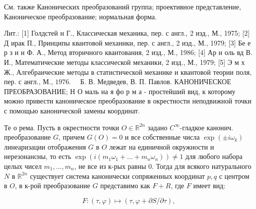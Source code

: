 \documentclass[10pt]{article}
\begin{document}
См. также Канонических преобразований группа; проективное представление, Каноническое преобразование; нормальная форма.



Лит.: [1] Голдстей н Г., Классическая механика, пер. с англ., 2 изд., М., 1975; [2] Д ирак П., Принципы квантовой механики, пер. с англ., 2 изд., М., 1979; [3] Бе е р з и н Ф. А., Метод вторичного квантования, 2 изд., М., 1986; [4] Ар н оль вд В. И., Математические методы классической механики, 2 изд., М., 1979; [5] Э м х Ж., Алгебраические методы в статистической механике и квантовой теории поля, пер. с англ., М., $1976 . \quad$ Б. В. Медведев, В. П. Павлов. КАНОНИЧЕСКОЕ ПРЕОБРАЗОВАНИЕ; Н О маль на я фо р м а - простейший вид, к которому можно привести каноническое преобразование в окрестности неподвижной точки с помощью канонической замены координат.



Те о рема. Пусть в окрестности точки $O \in \mathbb{R}^{2 n}$ задано $C^{\infty}$-гладкое канонич. преобразование $G$, причем $G(O)=0$ и все собственные числа $\exp \left( \pm i \omega_{k}\right)$ линеаризации отображения $G$ в $O$ лежат на единичной окружности и нерезонансны, то есть $\exp \left(i\left(m_{1} \omega_{1}+\ldots+m_{n} \omega_{n}\right)\right) \neq 1$ для любого набора целых чисел $m_{1}, \ldots, m_{n}$, не все из к-рых равны 0. Тогда для всякого натурального $N$ в $\mathbb{R}^{2 n}$ существует система канонически сопряженных координат $p, q$ с центром в $O$, в к-рой преобразование $G$ представимо как $F+R$, где $F$ имеет вид:



\[

F:(\tau, \varphi) \mapsto(\tau, \varphi+\partial S / \partial \tau),

\]
\end{document}
